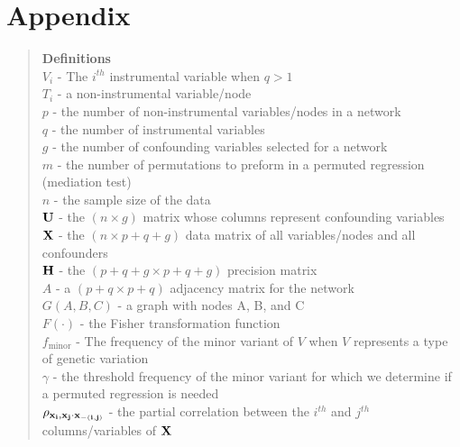 \documentclass[12pt]{report}
\begin{document}
\newpage
\section*{Appendix}
\begin{quote}
\textbf{Definitions}\\
$V_i$ - The $i^{th}$ instrumental variable when $q > 1$\\
$T_i$ - a non-instrumental variable/node\\
$p$ - the number of non-instrumental variables/nodes in a network\\
$q$ - the number of instrumental variables\\
$g$ - the number of confounding variables selected for a network\\
$m$ - the number of permutations to preform in a permuted regression (mediation test)\\
$n$ - the sample size of the data\\
$\bf U$ - the $(n \times g)$ matrix whose columns represent confounding variables\\
$\bf X$ - the $(n \times p+q+g)$ data matrix of all variables/nodes and all confounders\\
$\bf H$ - the $(p+q+g \times p+q+g)$ precision matrix \\
$A$ - a $(p+q \times p+q)$ adjacency matrix for the network  \\
$G(A,B,C)$ - a graph with nodes A, B, and C\\
$F(\cdot)$ - the Fisher transformation function\\
$f_{\text{minor}}$ - The frequency of the minor variant of $V$ when $V$ represents a type of genetic variation\\
$\gamma$ - the threshold frequency of the minor variant for which we determine if a permuted regression is needed\\
$\rho_{\bf x_i,x_j\cdot x_{ -(i,j)}  }$ - the partial correlation between the $i^{th}$ and $j^{th}$ columns/variables of ${\bf X}$
\end{quote}
\end{document}
